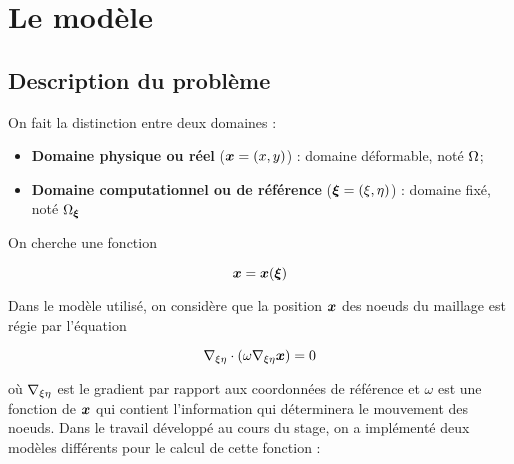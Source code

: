 \section{Le modèle}
\label{sec:modele}

\subsection{Description du problème}

\indent On fait la distinction entre deux domaines : 

\begin{itemize}
  \item \textbf{Domaine physique ou réel } (\(\boldsymbol{x} =(x,y)\)) : domaine déformable, noté \(\Omega\);
  \item \textbf{Domaine computationnel ou de référence } (\(\boldsymbol{\xi} =(\xi,\eta)\)) : domaine fixé, noté \(\Omega_{\boldsymbol{\xi}}\)
\end{itemize}

\indent On cherche une fonction 

\begin{equation*}
  \boldsymbol{x} = \boldsymbol{x}(\boldsymbol{\xi})
\end{equation*}

\indent Dans le modèle utilisé, on considère que la position \(\boldsymbol{x}\) des noeuds du maillage est régie par l'équation

\begin{equation*}
  \nabla_{\xi\eta} \cdot \left( \omega \nabla_{\xi\eta} \boldsymbol{x} \right) = 0
\end{equation*}

\noindent où \(\nabla_{\xi\eta}\) est le gradient par rapport aux coordonnées de référence et \(\omega\) est une fonction de \(\boldsymbol{x}\) qui contient l'information qui déterminera le mouvement des noeuds. Dans le travail développé au cours du stage, on a implémenté deux modèles différents pour le calcul de cette fonction : 

